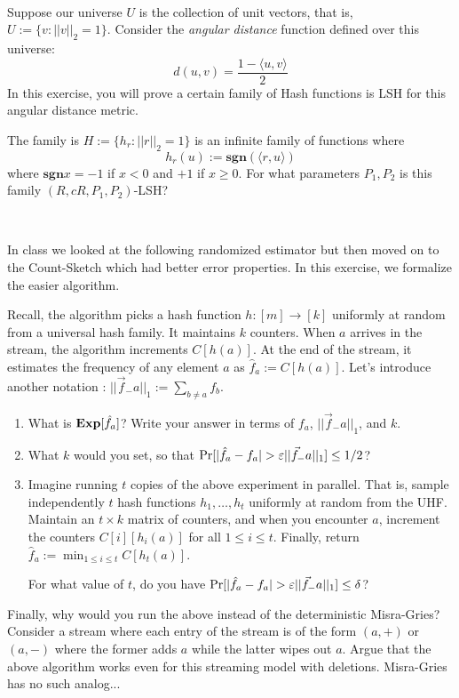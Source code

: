 \documentclass[11pt]{article}
\begin{document}
\vspace{1ex}
\begin{exercise}\Coffeecup {}~
	
	Suppose our universe $U$ is the collection of unit vectors, that is, $U := \{v: ||v||_2 = 1\}$.
	Consider the {\em angular distance} function defined over this universe:
	\[
		d(u,v) = \frac{1 - \langle u,v \rangle}{2}
	\]
	In this exercise, you will prove a certain family of Hash functions is LSH for this angular distance metric.
	
	The family is $H := \{h_r: ||r||_2 = 1\}$ is an infinite family of functions where 
	\[
	h_r(u) := \mathbf{sgn}(\langle r,u \rangle)
	\]
where $\mathbf{sgn}{x} = -1$ if $x < 0$ and $+1$ if $x \ge 0$. For what parameters $P_1,P_2$ is this family $(R,cR,P_1,P_2)$-LSH?
\end{exercise}

\vspace{1ex}
\begin{exercise}\Coffeecup {}~
	
	In class we looked at the following randomized estimator but then moved on to the Count-Sketch which had better error properties.
	In this exercise, we formalize the easier algorithm. 
	
	Recall, the algorithm picks a hash function $h:[m] \to [k]$ uniformly at random from a universal hash family. 
	It maintains $k$ counters. When $a$ arrives in the stream, the algorithm increments $C[h(a)]$. At the end of the stream, it estimates
	the frequency of any element $a$ as $\hat{f}_a := C[h(a)]$. Let's introduce another notation : $||\vec{f}_-a||_1 := \sum_{b\neq a} f_b$.
	
	\begin{enumerate}
		\item What is $\mathbf{Exp}[\hat{f}_a]$? Write your answer in terms of $f_a$, $||\vec{f}_-a||_1$, and $k$.
		\item What $k$ would you set, so that $\Pr[|\hat{f}_a - f_a| > \varepsilon ||\vec{f}_-a||_1 ] \le 1/2$?
		\item Imagine running $t$ copies of the above experiment in parallel. That is, sample independently $t$ hash functions $h_1,\ldots,h_t$ uniformly at random from the UHF. Maintain an $t\times k$ matrix of counters, and when you encounter $a$, increment the counters 
		$C[i][h_i(a)]$ for all $1\leq i\leq t$. Finally, return $\hat{f}_a := \min_{1\le i\leq t} C[h_t(a)]$. 
		
		For what value of $t$, do you have $\Pr[|\hat{f}_a - f_a| > \varepsilon ||\vec{f}_-a||_1 ] \le \delta$?
	\end{enumerate}
	
	Finally, why would you run the above instead of the deterministic Misra-Gries? Consider a stream where each entry of the stream is of the form 
	$(a,+)$ or $(a,-)$ where the former adds $a$ while the latter wipes out $a$. Argue that the above algorithm works even for this streaming model with deletions. Misra-Gries has no such analog...
	
\end{exercise}
\end{document}
